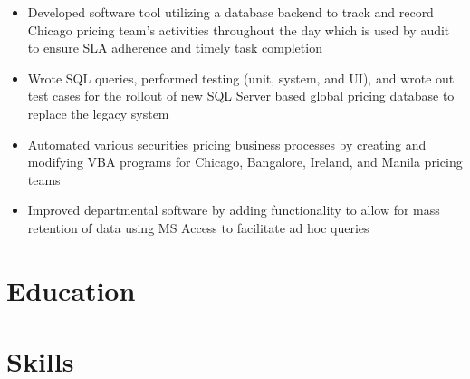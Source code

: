 \documentclass[10pt,a4paper,sans]{moderncv}
\begin{document}
\begin{itemize}
\item Developed software tool utilizing a database backend to track and record Chicago pricing team's activities throughout the day which is used by audit to ensure SLA adherence and timely task completion
\item Wrote SQL queries, performed testing (unit, system, and UI), and wrote out test cases for the rollout of new SQL Server based global pricing database to replace the legacy system
\item Automated various securities pricing business processes by creating and modifying VBA programs for Chicago, Bangalore, Ireland, and Manila pricing teams
\item Improved departmental software by adding functionality to allow for mass retention of data using MS Access to facilitate ad hoc queries
\end{itemize}

\section{Education}

\section{Skills}
\end{document}
